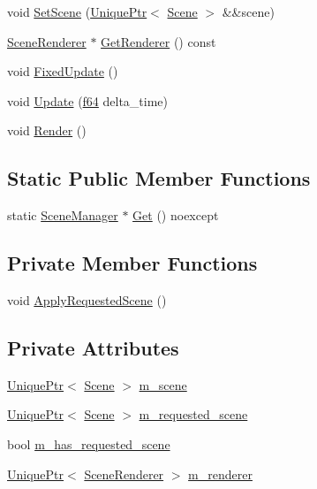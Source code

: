 \begin{DoxyCompactItemize}
void \hyperlink{classmage_1_1_scene_manager_abd9572b72caa412eda1f6c4e5d771fc3}{Set\+Scene} (\hyperlink{namespacemage_a3316d7143a973e37adf1110f2e80ca31}{Unique\+Ptr}$<$ \hyperlink{classmage_1_1_scene}{Scene} $>$ \&\&scene)
\item 
\hyperlink{classmage_1_1_scene_renderer}{Scene\+Renderer} $\ast$ \hyperlink{classmage_1_1_scene_manager_a44a10fe134b9c0215d9b4628b7c63994}{Get\+Renderer} () const
\item 
void \hyperlink{classmage_1_1_scene_manager_a6d97c0fb7945aeb53ec950e62567c1f4}{Fixed\+Update} ()
\item 
void \hyperlink{classmage_1_1_scene_manager_a6aafbd84ec59645341adeeb8902f1a0b}{Update} (\hyperlink{namespacemage_ab935747c6941320bd6214b5a5f265b09}{f64} delta\+\_\+time)
\item 
void \hyperlink{classmage_1_1_scene_manager_ac9ddb36bbd324bee8c702ea604633775}{Render} ()
\end{DoxyCompactItemize}
\subsection*{Static Public Member Functions}
\begin{DoxyCompactItemize}
\item 
static \hyperlink{classmage_1_1_scene_manager}{Scene\+Manager} $\ast$ \hyperlink{classmage_1_1_scene_manager_a282dbbea100d7de48c0b0876619db5e7}{Get} () noexcept
\end{DoxyCompactItemize}
\subsection*{Private Member Functions}
\begin{DoxyCompactItemize}
\item 
void \hyperlink{classmage_1_1_scene_manager_adadc65dc4bd9643c1befd261903309f7}{Apply\+Requested\+Scene} ()
\end{DoxyCompactItemize}
\subsection*{Private Attributes}
\begin{DoxyCompactItemize}
\item 
\hyperlink{namespacemage_a3316d7143a973e37adf1110f2e80ca31}{Unique\+Ptr}$<$ \hyperlink{classmage_1_1_scene}{Scene} $>$ \hyperlink{classmage_1_1_scene_manager_a774c610dba3ece25acf97915b6368a1a}{m\+\_\+scene}
\item 
\hyperlink{namespacemage_a3316d7143a973e37adf1110f2e80ca31}{Unique\+Ptr}$<$ \hyperlink{classmage_1_1_scene}{Scene} $>$ \hyperlink{classmage_1_1_scene_manager_a74bdb7b0805208b039991e9b9abc741f}{m\+\_\+requested\+\_\+scene}
\item 
bool \hyperlink{classmage_1_1_scene_manager_aff9889d9fc53a3524b0e88d10cd544d6}{m\+\_\+has\+\_\+requested\+\_\+scene}
\item 
\hyperlink{namespacemage_a3316d7143a973e37adf1110f2e80ca31}{Unique\+Ptr}$<$ \hyperlink{classmage_1_1_scene_renderer}{Scene\+Renderer} $>$ \hyperlink{classmage_1_1_scene_manager_ac50da0df383825fa3b4627cb42981498}{m\+\_\+renderer}
\end{DoxyCompactItemize}


